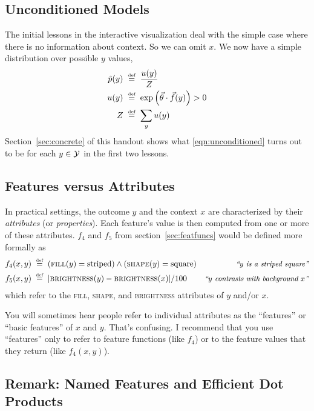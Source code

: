 \documentclass[11pt]{article}
\newcommand{\defeq}{\;\stackrel{\mbox{\tiny def}}{=}\;}
\newcommand{\vtheta}{\vec{\theta}}
\newcommand{\ph}{\hat{p}}
\begin{document}
\subsection{Unconditioned Models}

The initial lessons in the interactive visualization deal with the
simple case where there is no information about context.  So we can
omit $x$.  We now have a simple distribution over possible $y$ values,
\begin{align}
  \ph(y) &\defeq \frac{u(y)}{Z} \label{eqn:unconditioned} \\
  u(y) &\defeq \exp \left(\vtheta \cdot \vec{f}(y)\right) > 0 \\
  Z &\defeq \sum_y u(y)
\end{align}
Section~\ref{sec:concrete} of this handout shows what \eqref{eqn:unconditioned}
turns out to be for each $y \in {\cal Y}$ in the first two lessons.

\subsection{Features versus Attributes}

In practical settings, the outcome $y$ and the context $x$ are
characterized by their {\em attributes} (or {\em properties}).  Each
feature's value is then computed from one or more of these attributes.
$f_4$ and $f_5$ from section~\ref{sec:featfuncs} would be defined more formally as
\begin{align}
f_4(x,y) & \defeq (\textsc{fill}(y)=\text{striped}) \wedge (\textsc{shape}(y)=\text{square})
             & \text{\small\it ``$y$ is a striped square''} \\
f_5(x,y) & \defeq |\textsc{brightness}(y)-\textsc{brightness}(x)|/100
             & \text{\small\it ``$y$ contrasts with background $x$''}
\end{align}
which refer to the \textsc{fill}, \textsc{shape}, and \textsc{brightness} attributes
of $y$ and/or $x$. 

You will sometimes hear people refer to individual attributes as the
``features'' or ``basic features'' of $x$ and $y$.  That's confusing.
I recommend that you use ``features'' only to refer to feature
functions (like $f_4$) or to the feature values that they return (like $f_4(x,y)$).

\subsection{Remark: Named Features and Efficient Dot Products}
\end{document}
